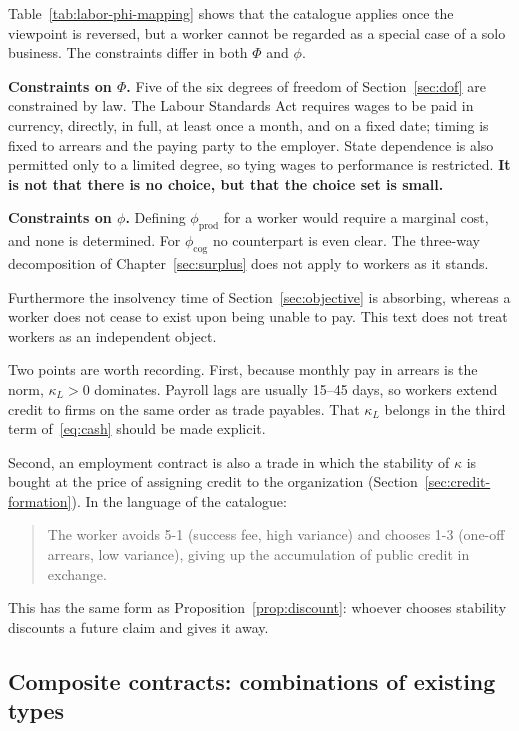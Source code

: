 \begin{remark}
\label{rem:worker-constraints}
Table~\ref{tab:labor-phi-mapping} shows that the catalogue applies once the viewpoint is
reversed, but
a worker cannot be regarded as a special case of a solo business. The constraints differ in
both $\Phi$ and $\phi$.

\textbf{Constraints on $\Phi$.} Five of the six degrees of freedom of Section~\ref{sec:dof}
are constrained by law. The Labour Standards Act requires wages to be paid in currency,
directly, in full, at least once a month, and on a fixed date; timing is fixed to arrears
and the paying party to the employer. State dependence is also permitted only to a limited
degree, so tying wages to performance is restricted.
\textbf{It is not that there is no choice, but that the choice set is small.}

\textbf{Constraints on $\phi$.} Defining $\phi_{\mathrm{prod}}$ for a worker would require a
marginal cost, and none is determined. For $\phi_{\mathrm{cog}}$ no counterpart is even
clear. The three-way decomposition of Chapter~\ref{sec:surplus} does not apply to workers as
it stands.

Furthermore the insolvency time of Section~\ref{sec:objective} is absorbing, whereas a worker
does not cease to exist upon being unable to pay. This text does not treat workers as an
independent object.
\end{remark}

Two points are worth recording. First, because monthly pay in arrears is the norm,
$\kappa_L>0$ dominates. Payroll lags are usually 15--45 days, so workers extend credit to
firms on the same order as trade payables. That $\kappa_L$ belongs in the third term
of~\eqref{eq:cash} should be made explicit.

Second, an employment contract is also a trade in which the stability of $\kappa$ is bought
at the price of assigning credit to the organization (Section~\ref{sec:credit-formation}).
In the language of the catalogue:
\begin{quote}
The worker avoids 5-1 (success fee, high variance) and chooses 1-3 (one-off arrears, low
variance), giving up the accumulation of public credit in exchange.
\end{quote}
This has the same form as Proposition~\ref{prop:discount}: whoever chooses stability
discounts a future claim and gives it away.

\subsection{Composite contracts: combinations of existing types}
\label{sec:composite}

